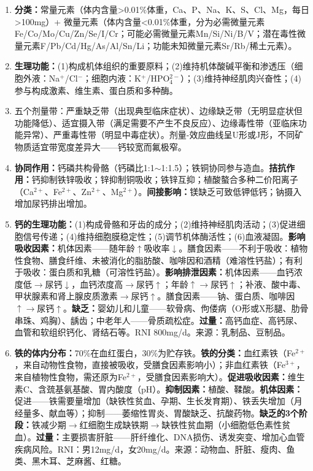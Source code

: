 {\begin{enumerate}[leftmargin=*, itemsep=5pt]
    \item \textbf{分类：}常量元素（体内含量>0.01\%体重，Ca、P、Na、K、S、Cl、Mg，每日>100mg）+ 微量元素（体内含量<0.01\%体重，分为必需微量元素Fe/Co/Mo/Cu/Zn/Se/I/Cr；可能必需微量元素Mn/Si/Ni/B/V；潜在毒性微量元素F/Pb/Cd/Hg/As/Al/Sn/Li；功能未知微量元素Sr/Rb/稀土元素）。

    \item \textbf{生理功能：}(1)构成机体组织的重要原料；(2)维持机体酸碱平衡和渗透压（细胞外液：Na$^+$/Cl$^-$；细胞内液：K$^+$/HPO$_4^{2-}$）；(3)维持神经肌肉兴奋性；(4)参与构成激素、维生素、蛋白质和多种酶。

    \item 五个剂量带：严重缺乏带（出现典型临床症状）、边缘缺乏带（无明显症状但功能降低）、适宜摄入带（满足需要不产生不良反应）、边缘毒性带（亚临床功能异常）、严重毒性带（明显中毒症状）。剂量-效应曲线呈U形或J形，不同矿物质适宜带宽度差异大——钙较宽而氟极窄。

    \item \textbf{协同作用：}钙磷共构骨骼（钙磷比1:1$\sim$1:1.5）；铁铜协同参与造血。\textbf{拮抗作用：}钙抑制铁锌吸收；锌抑制铜吸收；铁锌互抑；植酸螯合多种二价阳离子（Ca$^{2+}$、Fe$^{2+}$、Zn$^{2+}$、Mg$^{2+}$）。\textbf{间接影响：}镁缺乏可致低钾低钙；钠摄入增加尿钙排出增加。

    \item \textbf{钙的生理功能：}(1)构成骨骼和牙齿的成分；(2)维持神经肌肉活动；(3)促进细胞信号传递；(4)维持细胞膜稳定性；(5)调节机体酶活性；(6)血液凝固。\textbf{影响吸收因素：}机体因素——随年龄$\uparrow$吸收率$\downarrow$。膳食因素——不利于吸收：植物性食物、膳食纤维、未被消化的脂肪酸、咖啡因和酒精（难溶性钙盐）；有利于吸收：蛋白质和乳糖（可溶性钙盐）。\textbf{影响排泄因素：}机体因素——血钙浓度低$\rightarrow$尿钙$\downarrow$，血钙浓度高$\rightarrow$尿钙$\uparrow$；年龄$\uparrow \rightarrow$尿钙$\uparrow$；补液、酸中毒、甲状腺素和肾上腺皮质激素$\rightarrow$尿钙$\uparrow$。膳食因素——钠、蛋白质、咖啡因$\uparrow \rightarrow$尿钙$\uparrow$。\textbf{缺乏：}婴幼儿和儿童——软骨病、佝偻病（O形或X形腿、肋骨串珠、鸡胸）、龋齿；中老年人——骨质疏松症。\textbf{过量：}高钙血症、高钙尿、血管和软组织钙化、肾结石等。RNI 800mg/d。来源：乳制品、豆制品。

    \item \textbf{铁的体内分布：}70\%在血红蛋白，30\%为贮存铁。\textbf{铁的分类：}血红素铁（Fe$^{2+}$，来自动物性食物，直接被吸收，受膳食因素影响小）；非血红素铁（Fe$^{3+}$，来自植物性食物，需还原为Fe$^{2+}$，受膳食因素影响大）。\textbf{促进吸收因素：}维生素C、含巯基氨基酸、胃内酸度（pH）。\textbf{抑制因素：}植酸、鞣酸。\textbf{机体因素：}促进——铁需要量增加（缺铁性贫血、孕期、生长发育期）、铁丢失增加（月经量多、献血等）；抑制——萎缩性胃炎、胃酸缺乏、抗酸药物。\textbf{缺乏的3个阶段：}铁减少期$\rightarrow$红细胞生成缺铁期$\rightarrow$缺铁性贫血期（小细胞低色素性贫血）。\textbf{过量：}主要损害肝脏——肝纤维化、DNA损伤、诱发突变、增加心血管疾病风险。RNI：男12mg/d，女20mg/d。来源：动物血、肝脏、瘦肉、鱼类、黑木耳、芝麻酱、红糖。


\end{enumerate}}
